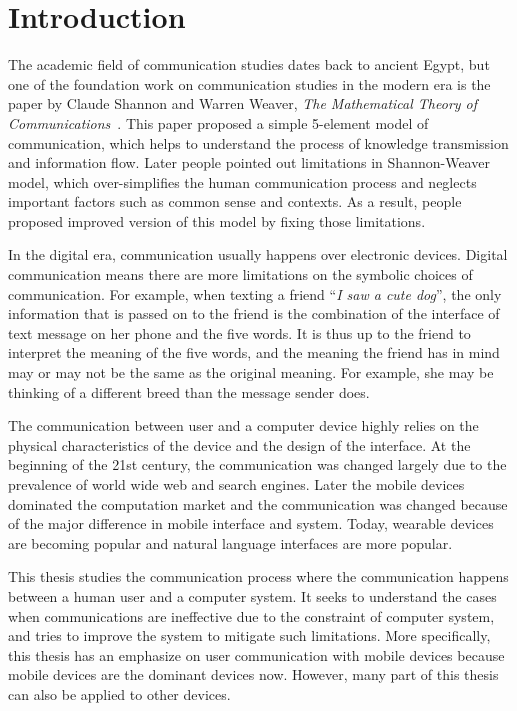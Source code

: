
\chapter{Introduction}

The academic field of communication studies dates back to ancient Egypt, but one of the foundation work on communication studies in the modern era is the paper by Claude Shannon and Warren Weaver, \textit{The Mathematical Theory of Communications}~\cite{shannon1951mathematical}. This paper proposed a simple 5-element model of communication, which helps to understand the process of knowledge transmission and information flow. Later people pointed out limitations in Shannon-Weaver model, which over-simplifies the human communication process and neglects important factors such as common sense and contexts. As a result, people proposed improved version of this model by fixing those limitations. 

In the digital era, communication usually happens over electronic devices. Digital communication means there are more limitations on the symbolic choices of communication. For example, when texting a friend ``\textit{I saw a cute dog}'', the only information that is passed on to the friend is the combination of the interface of text message on her phone and the five words. It is thus up to the friend to interpret the meaning of the five words, and the meaning the friend has in mind may or may not be the same as the original meaning. For example, she may be thinking of a different breed than the message sender does. 

The communication between user and a computer device highly relies on the physical characteristics of the device and the design of the interface. At the beginning of the 21st century, the communication was changed largely due to the prevalence of world wide web and search engines. Later the mobile devices dominated the computation market and the communication was changed because of the major difference in mobile interface and system. Today, wearable devices are becoming popular and natural language interfaces are more popular. 

This thesis studies the communication process where the communication happens between a human user and a computer system. It seeks to understand the cases when communications are ineffective due to the constraint of computer system, and tries to improve the system to mitigate such limitations. More specifically, this thesis has an emphasize on user communication with mobile devices because mobile devices are the dominant devices now. However, many part of this thesis can also be applied to other devices. 

